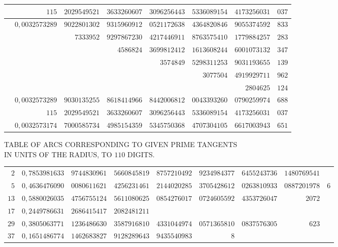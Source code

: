 \begin{longtable}{@{}rrrrrrrr@{}}
\hline
 & $115$ & $2029549521$ & $3633260607$ & $3096256443$ & $5336089154$ & $4173256031$ & $037$\\
\hline
 & $0{,}0032573289$ & $9022801302$ & $9315960912$ & $0521172638$ & $4364820846$ & $9055374592$ & $833$\\
 &  & $7333952$ & $9297867230$ & $4217446911$ & $8763575410$ & $1779884257$ & $283$\\
 &  &  & $4586824$ & $3699812412$ & $1613608244$ & $6001073132$ & $347$\\
 &  &  &  & $3574849$ & $5298311253$ & $9031193655$ & $139$\\
 &  &  &  &  & $3077504$ & $4919929711$ & $962$\\
 &  &  &  &  &  & $2804625$ & $124$\\
\hline
 & $0{,}0032573289$ & $9030135255$ & $8618414966$ & $8442006812$ & $0043393260$ & $0790259974$ & $688$\\
 & $115$ & $2029549521$ & $3633260607$ & $3096256443$ & $5336089154$ & $4173256031$ & $037$\\
\hline
 & $0{,}0032573174$ & $7000585734$ & $4985154359$ & $5345750368$ & $4707304105$ & $6617003943$ & $651$\\
\end{longtable}\endgroup
\par{}
\begin{center}\small TABLE OF ARCS CORRESPONDING TO GIVEN PRIME TANGENTS\\
IN UNITS OF THE RADIUS, TO $110$ DIGITS.\end{center}
\begingroup\fontsize{8.5}{11}\selectfont\setlength{\tabcolsep}{1.5pt}
\begin{longtable}{@{}r|rrrrrrrr@{}}
\hline
$2$ & $0{,}7853981633$ & $9744830961$ & $5660845819$ & $8757210492$ & $9234984377$ & $6455243736$ & $1480769541$ & \\
$5$ & $0{,}4636476090$ & $0080611621$ & $4256231461$ & $2144020285$ & $3705428612$ & $0263810933$ & $0887201978$ & $6$\\
$13$ & $0{,}5880026035$ & $4756755124$ & $5611080625$ & $0854276017$ & $0724605592$ & $4353726047$ & $2072$ & \\
$17$ & $0{,}2449786631$ & $2686415417$ & $2082481211$ &  &  &  &  & \\
$29$ & $0{,}3805063771$ & $1236486630$ & $3587916810$ & $4331044974$ & $0571365810$ & $0837576305$ & $623$ & \\
$37$ & $0{,}1651486774$ & $1462683827$ & $9128289643$ & $9435540983$ & $8$ &  &  & \\
\end{longtable}\endgroup
